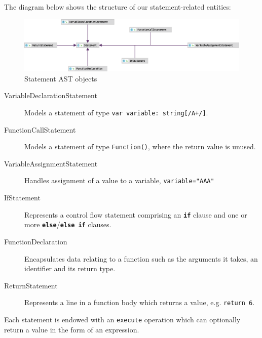 \documentclass[a4paper,openany,12pt]{book}
\begin{document}
The diagram below shows the structure of our statement-related entities:

\begin{figure}[H]
    \begin{MyMdframed}
        \vspace{0.5em}

        \caption{\label{figure:ast:statements}Statement AST objects}
        \vspace{0.5em}
        \captionsetup{style=default}

        \centering \includegraphics[width=0.9\linewidth]{statements.eps}
    \end{MyMdframed}
\end{figure}

\begin{description}
    \item[VariableDeclarationStatement] Models a statement of type \texttt{var variable: string[/A+/]}.
    \item[FunctionCallStatement] Models a statement of type \texttt{Function()}, where the return value is unused.
    \item[VariableAssignmentStatement] Handles assignment of a value to a variable, \texttt{variable="AAA"}
    \item[IfStatement] Represents a control flow statement comprising an \textbf{\textcolor{id7-aubergine}{\texttt{if}}} clause and one or more \textbf{\textcolor{id7-aubergine}{\texttt{else}}}/\textbf{\textcolor{id7-aubergine}{\texttt{else if}}} clauses.
    \item[FunctionDeclaration] Encapsulates data relating to a function such as the arguments it takes, an identifier and its return type.
    \item[ReturnStatement] Represents a line in a function body which returns a value, e.g. \texttt{return 6}.
\end{description}

Each statement is endowed with an \texttt{execute} operation which can optionally return a value in the form of an
expression.
\end{document}
